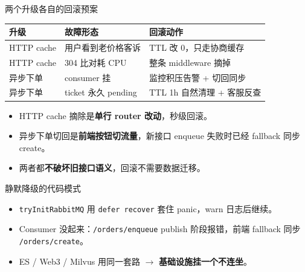 \begin{frame}{两个升级各自的回滚预案}
\begin{tabular}{@{}lll@{}}
\toprule
升级 & 故障形态 & 回滚动作 \\
\midrule
HTTP cache & 用户看到老价格客诉 & TTL 改 0，只走协商缓存 \\
HTTP cache & 304 比对耗 CPU     & 整条 middleware 摘掉 \\
异步下单   & consumer 挂        & 监控积压告警 + 切回同步 \\
异步下单   & ticket 永久 pending & TTL 1h 自然清理 + 客服反查 \\
\bottomrule
\end{tabular}
\vspace{2mm}
\begin{itemize}
  \item HTTP cache 摘除是\textbf{单行 router 改动}，秒级回滚。
  \item 异步下单切回是\textbf{前端按钮切流量}，新接口 enqueue 失败时已经 fallback 同步 create。
  \item 两者都\textbf{不破坏旧接口语义}，回滚不需要数据迁移。
\end{itemize}
\end{frame}

\begin{frame}{静默降级的代码模式}
\vspace{2mm}
\begin{itemize}
  \item \texttt{tryInitRabbitMQ} 用 \texttt{defer recover} 套住 panic，warn 日志后继续。
  \item Consumer 没起来：\texttt{/orders/enqueue} publish 阶段报错，前端 fallback 同步 \texttt{/orders/create}。
  \item ES / Web3 / Milvus 用同一套路 $\to$ \textbf{基础设施挂一个不连坐}。
\end{itemize}
\end{frame}

